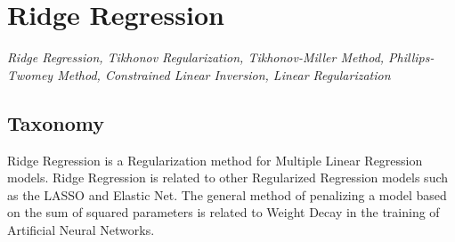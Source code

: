 
\section{Ridge Regression} 
\label{sec:ridge}

\emph{Ridge Regression, Tikhonov Regularization, Tikhonov-Miller Method, Phillips-Twomey Method, Constrained Linear Inversion, Linear Regularization}

\subsection{Taxonomy}
Ridge Regression is a Regularization method for Multiple Linear Regression models.
Ridge Regression is related to other Regularized Regression models such as the LASSO and Elastic Net.
The general method of penalizing a model based on the sum of squared parameters is related to Weight Decay in the training of Artificial Neural Networks.

